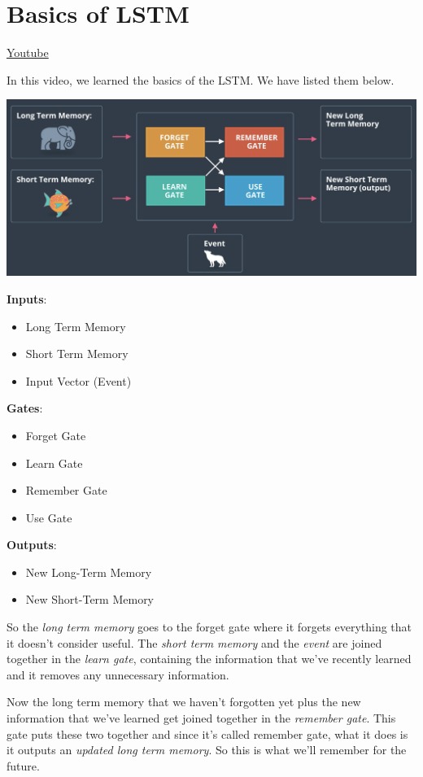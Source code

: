 \section{Basics of LSTM}
\href{https://www.youtube.com/watch?v=gjb68a4XsqE&t=5s&ab_channel=Udacity}{Youtube} \newline

In this video, we learned the basics of the LSTM. We have listed them below.

\includegraphics[width=1\linewidth]{img//rnn//lstm/basicsoflstm.png}

\textbf{Inputs}:
\begin{itemize}
    \item Long Term Memory
    \item Short Term Memory
    \item Input Vector (Event)
\end{itemize}

\textbf{Gates}:
\begin{itemize}
    \item Forget Gate
    \item Learn Gate
    \item Remember Gate
    \item Use Gate
\end{itemize}
\textbf{Outputs}:
\begin{itemize}
    \item New Long-Term Memory
    \item New Short-Term Memory
\end{itemize}

So the \textit{long term memory} goes to the forget gate where it forgets everything that it doesn't consider useful. The \textit{short term memory} and the \textit{event} are joined together in the \textit{learn gate}, containing the information that we've recently learned and it removes any unnecessary information.

Now the long term memory that we haven't forgotten yet plus the new information that we've learned get joined together in the \textit{remember gate}. This gate puts these two together and since it's called remember gate, what it does is it outputs an\textit{ updated long term memory}. So this is what we'll remember for the future.

